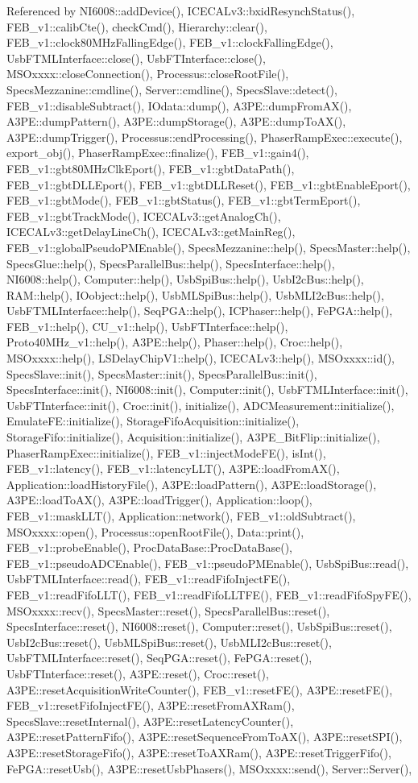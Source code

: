 Referenced by NI6008::addDevice(), ICECALv3::bxidResynchStatus(), FEB\_\-v1::calibCte(), checkCmd(), Hierarchy::clear(), FEB\_\-v1::clock80MHzFallingEdge(), FEB\_\-v1::clockFallingEdge(), UsbFTMLInterface::close(), UsbFTInterface::close(), MSOxxxx::closeConnection(), Processus::closeRootFile(), SpecsMezzanine::cmdline(), Server::cmdline(), SpecsSlave::detect(), FEB\_\-v1::disableSubtract(), IOdata::dump(), A3PE::dumpFromAX(), A3PE::dumpPattern(), A3PE::dumpStorage(), A3PE::dumpToAX(), A3PE::dumpTrigger(), Processus::endProcessing(), PhaserRampExec::execute(), export\_\-obj(), PhaserRampExec::finalize(), FEB\_\-v1::gain4(), FEB\_\-v1::gbt80MHzClkEport(), FEB\_\-v1::gbtDataPath(), FEB\_\-v1::gbtDLLEport(), FEB\_\-v1::gbtDLLReset(), FEB\_\-v1::gbtEnableEport(), FEB\_\-v1::gbtMode(), FEB\_\-v1::gbtStatus(), FEB\_\-v1::gbtTermEport(), FEB\_\-v1::gbtTrackMode(), ICECALv3::getAnalogCh(), ICECALv3::getDelayLineCh(), ICECALv3::getMainReg(), FEB\_\-v1::globalPseudoPMEnable(), SpecsMezzanine::help(), SpecsMaster::help(), SpecsGlue::help(), SpecsParallelBus::help(), SpecsInterface::help(), NI6008::help(), Computer::help(), UsbSpiBus::help(), UsbI2cBus::help(), RAM::help(), IOobject::help(), UsbMLSpiBus::help(), UsbMLI2cBus::help(), UsbFTMLInterface::help(), SeqPGA::help(), ICPhaser::help(), FePGA::help(), FEB\_\-v1::help(), CU\_\-v1::help(), UsbFTInterface::help(), Proto40MHz\_\-v1::help(), A3PE::help(), Phaser::help(), Croc::help(), MSOxxxx::help(), LSDelayChipV1::help(), ICECALv3::help(), MSOxxxx::id(), SpecsSlave::init(), SpecsMaster::init(), SpecsParallelBus::init(), SpecsInterface::init(), NI6008::init(), Computer::init(), UsbFTMLInterface::init(), UsbFTInterface::init(), Croc::init(), initialize(), ADCMeasurement::initialize(), EmulateFE::initialize(), StorageFifoAcquisition::initialize(), StorageFifo::initialize(), Acquisition::initialize(), A3PE\_\-BitFlip::initialize(), PhaserRampExec::initialize(), FEB\_\-v1::injectModeFE(), isInt(), FEB\_\-v1::latency(), FEB\_\-v1::latencyLLT(), A3PE::loadFromAX(), Application::loadHistoryFile(), A3PE::loadPattern(), A3PE::loadStorage(), A3PE::loadToAX(), A3PE::loadTrigger(), Application::loop(), FEB\_\-v1::maskLLT(), Application::network(), FEB\_\-v1::oldSubtract(), MSOxxxx::open(), Processus::openRootFile(), Data::print(), FEB\_\-v1::probeEnable(), ProcDataBase::ProcDataBase(), FEB\_\-v1::pseudoADCEnable(), FEB\_\-v1::pseudoPMEnable(), UsbSpiBus::read(), UsbFTMLInterface::read(), FEB\_\-v1::readFifoInjectFE(), FEB\_\-v1::readFifoLLT(), FEB\_\-v1::readFifoLLTFE(), FEB\_\-v1::readFifoSpyFE(), MSOxxxx::recv(), SpecsMaster::reset(), SpecsParallelBus::reset(), SpecsInterface::reset(), NI6008::reset(), Computer::reset(), UsbSpiBus::reset(), UsbI2cBus::reset(), UsbMLSpiBus::reset(), UsbMLI2cBus::reset(), UsbFTMLInterface::reset(), SeqPGA::reset(), FePGA::reset(), UsbFTInterface::reset(), A3PE::reset(), Croc::reset(), A3PE::resetAcquisitionWriteCounter(), FEB\_\-v1::resetFE(), A3PE::resetFE(), FEB\_\-v1::resetFifoInjectFE(), A3PE::resetFromAXRam(), SpecsSlave::resetInternal(), A3PE::resetLatencyCounter(), A3PE::resetPatternFifo(), A3PE::resetSequenceFromToAX(), A3PE::resetSPI(), A3PE::resetStorageFifo(), A3PE::resetToAXRam(), A3PE::resetTriggerFifo(), FePGA::resetUsb(), A3PE::resetUsbPhasers(), MSOxxxx::send(), Server::Server(), 